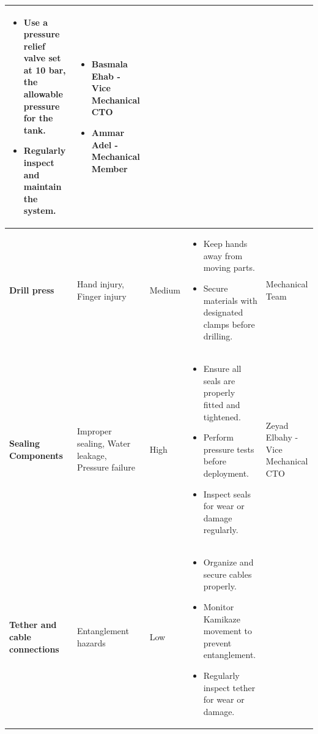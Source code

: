 \documentclass[conference, 12pt]{IEEEtran}
\begin{document}
\begin{longtable}{|>{\raggedright}p{3.5cm}|>{\raggedright}p{3.5cm}|p{1.5cm}|>{\raggedright}p{5cm}|p{3cm}|}
\begin{itemize}[leftmargin=*]
            \item Use a pressure relief valve set at 10 bar, the allowable pressure for the tank.
            \item Regularly inspect and maintain the system.
        \end{itemize}
        & {\raggedright
        \vspace{-0.8\baselineskip}\begin{itemize}[leftmargin=*]
                \item Basmala Ehab - Vice Mechanical CTO
                \item Ammar Adel - Mechanical Member
            \end{itemize} 
            \par}\\
    \hline
    \textbf{Drill press}
        & Hand injury, Finger injury
        & Medium
        & \vspace{-0.8\baselineskip}\begin{itemize}[leftmargin=*]
            \item Keep hands away from moving parts.
            \item Secure materials with designated clamps before drilling.
        \end{itemize}
        & Mechanical Team \\
    \textbf{Sealing Components}
        & Improper sealing, Water leakage, Pressure failure
        & High
        & \vspace{-0.8\baselineskip}\begin{itemize}[leftmargin=*]
            \item Ensure all seals are properly fitted and tightened.
            \item Perform pressure tests before deployment.
            \item Inspect seals for wear or damage regularly.
        \end{itemize}
        & Zeyad Elbahy - Vice Mechanical CTO \\
    \hline
    \textbf{Tether and cable connections}
        & Entanglement hazards
        & Low
        & \vspace{-0.8\baselineskip}\begin{itemize}[leftmargin=*]
            \item Organize and secure cables properly.
            \item Monitor Kamikaze movement to prevent entanglement.
            \item Regularly inspect tether for wear or damage.

\end{itemize}
\end{longtable}
\end{document}

